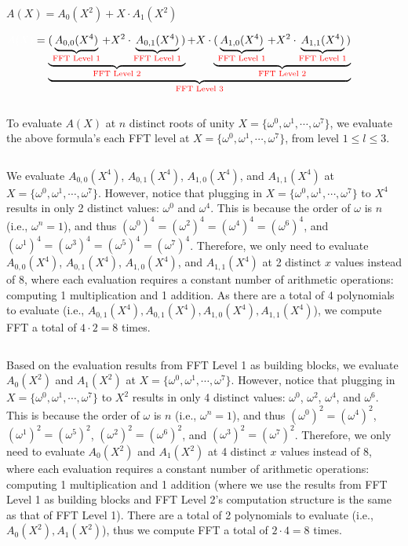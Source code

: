 $A(X) = A_0(X^2) + X \cdot A_1(X^2)$

$\mathcolor{white}{A(X)} = \underbrace{\underbrace{(\underbrace{A_{0,0}(X^4)}_{\text{\mymathcolor{red}{FFT Level 1}}} + X^2\cdot \underbrace{A_{0,1}(X^4)}_{\text{\mymathcolor{red}{FFT Level 1}}})}_{\text{\mymathcolor{red}{FFT Level 2}}} + X \cdot \underbrace{(\underbrace{A_{1,0}(X^4)}_{\text{\mymathcolor{red}{FFT Level 1}}} + X^2\cdot \underbrace{A_{1,1}(X^4)}_{\text{\mymathcolor{red}{FFT Level 1}}})}_{\text{\mymathcolor{red}{FFT Level 2}}}}_{\text{\mymathcolor{red}{FFT Level 3}}}$

$ $

To evaluate $A(X)$ at $n$ distinct roots of unity $X = \{\omega^0, \omega^1, \cdots, \omega^7\}$, we evaluate the above formula's each FFT level at $X = \{\omega^0, \omega^1, \cdots, \omega^7\}$, from level $1 \leq l \leq 3$. 

$ $

 We evaluate $A_{0,0}(X^4)$, $A_{0,1}(X^4)$, $A_{1,0}(X^4)$, and $A_{1,1}(X^4)$ at $X = \{\omega^0, \omega^1, \cdots, \omega^7\}$. However, notice that plugging in $X = \{\omega^0, \omega^1, \cdots, \omega^7\}$ to $X^4$ results in only 2 distinct values: $\omega^0$ and $\omega^4$. This is because the order of $\omega$ is $n$ (i.e., $\omega^n = 1$), and thus $(\omega^0)^4 = (\omega^2)^4 = (\omega^4)^4 = (\omega^6)^4$, and $(\omega^1)^4 = (\omega^3)^4 = (\omega^5)^4 = (\omega^7)^4$. Therefore, we only need to evaluate $A_{0,0}(X^4)$, $A_{0,1}(X^4)$, $A_{1,0}(X^4)$, and $A_{1,1}(X^4)$ at 2 distinct $x$ values instead of 8, where each evaluation requires a constant number of arithmetic operations: computing 1 multiplication and 1 addition. As there are a total of 4 polynomials to evaluate (i.e., $A_{0, 1}(X^4), A_{0, 1}(X^4), A_{1, 0}(X^4), A_{1, 1}(X^4)$), we compute FFT a total of $4 \cdot 2 = 8$ times. 

$ $

 Based on the evaluation results from FFT Level 1 as building blocks, we evaluate $A_{0}(X^2)$ and $A_{1}(X^2)$ at $X = \{\omega^0, \omega^1, \cdots, \omega^7\}$. However, notice that plugging in $X = \{\omega^0, \omega^1, \cdots, \omega^7\}$ to $X^2$ results in only 4 distinct values: $\omega^0$, $\omega^2$, $\omega^4$, and $\omega^6$.
This is because the order of $\omega$ is $n$ (i.e., $\omega^n = 1$), and thus $(\omega^0)^2 = (\omega^4)^2$, $(\omega^1)^2 = (\omega^5)^2$, $(\omega^2)^2 = (\omega^6)^2$, and $(\omega^3)^2 = (\omega^7)^2$. Therefore, we only need to evaluate $A_{0}(X^2)$ and $A_{1}(X^2)$ at 4 distinct $x$ values instead of 8, where each evaluation requires a constant number of arithmetic operations: computing 1 multiplication and 1 addition (where we use the results from FFT Level 1 as building blocks and FFT Level 2's computation structure is the same as that of FFT Level 1). There are a total of 2 polynomials to evaluate (i.e., $A_{0}(X^2), A_{1}(X^2)$), thus we compute FFT a total of $2 \cdot 4 = 8$ times. 

